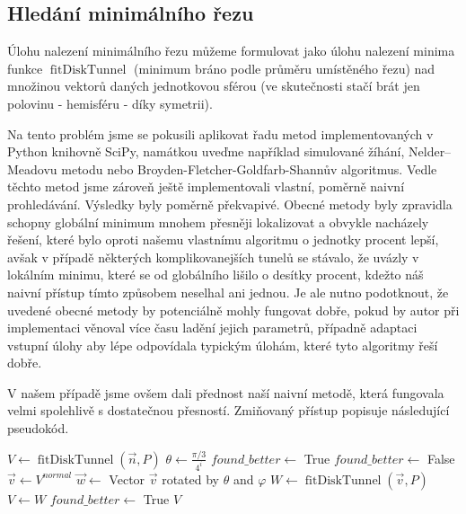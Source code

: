\subsection{Hledání minimálního řezu} \label{subsec:min_cut}
Úlohu nalezení minimálního řezu můžeme formulovat jako úlohu nalezení minima
funkce $ \operatorname{fitDiskTunnel} $ (minimum bráno podle průměru umístěného řezu)
nad množinou vektorů daných jednotkovou sférou (ve skutečnosti stačí brát
jen polovinu - hemisféru - díky symetrii).

Na tento problém jsme se pokusili aplikovat řadu metod implementovaných v Python
knihovně SciPy, namátkou uveďme například simulované žíhání, Nelder–Meadovu metodu
nebo Broyden-Fletcher-Goldfarb-Shannův algoritmus. Vedle těchto metod jsme zároveň
ještě implementovali vlastní, poměrně naivní prohledávání. Výsledky byly poměrně
překvapivé. Obecné metody byly zpravidla schopny globální minimum mnohem přesněji
lokalizovat a obvykle nacházely řešení, které bylo oproti našemu vlastnímu
algoritmu o jednotky procent lepší, avšak v případě některých komplikovanejších
tunelů se stávalo, že uvázly v lokálním minimu, které se od globálního lišilo
o desítky procent, kdežto náš naivní přístup tímto způsobem neselhal ani jednou.
Je ale nutno podotknout, že uvedené obecné metody by potenciálně mohly fungovat
dobře, pokud by autor při implementaci věnoval více času ladění jejich parametrů,
případně adaptaci vstupní úlohy aby lépe odpovídala typickým úlohám, které tyto
algoritmy řeší dobře.

V našem případě jsme ovšem dali přednost naší naivní metodě, která
fungovala velmi spolehlivě s dostatečnou přesností. Zmiňovaný přístup popisuje
následující pseudokód.


\begin{algorithmic}[1]
\label{alg:findMinimalDisk}

    \State $ V  \gets \operatorname{fitDiskTunnel}(\vec{n}, P) $
        \State $ \theta \gets \frac{\pi / 3}{4^i} $
        \State $ found\_better \gets $ True
            \State $ found\_better \gets $ False
            \State $ \vec{v} \gets V^{normal} $
                \State $ \vec{w} \gets$ Vector $\vec{v} $ rotated by $ \theta $ and $\varphi $
                \State $ W \gets \operatorname{fitDiskTunnel}(\vec{v}, P) $
                    \State $ V \gets W $
                    \State $ found\_better \gets $ True
                \EndIf
            \EndFor
        \EndWhile
    \EndFor
    \State \Return $V$
\EndFunction

\end{algorithmic}
